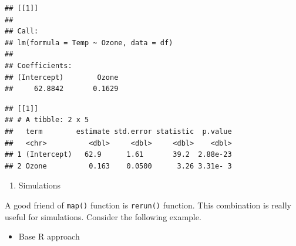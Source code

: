 \documentclass[
]{book}
\newenvironment{Shaded}{\begin{snugshade}}{\end{snugshade}}
\newcommand{\AttributeTok}[1]{\textcolor[rgb]{0.13,0.29,0.53}{#1}}
\newcommand{\CommentTok}[1]{\textcolor[rgb]{0.56,0.35,0.01}{\textit{#1}}}
\newcommand{\DecValTok}[1]{\textcolor[rgb]{0.00,0.00,0.81}{#1}}
\newcommand{\FunctionTok}[1]{\textcolor[rgb]{0.13,0.29,0.53}{\textbf{#1}}}
\newcommand{\NormalTok}[1]{#1}
\newcommand{\OtherTok}[1]{\textcolor[rgb]{0.56,0.35,0.01}{#1}}
\newcommand{\SpecialCharTok}[1]{\textcolor[rgb]{0.81,0.36,0.00}{\textbf{#1}}}
\providecommand{\tightlist}{%
  \setlength{\itemsep}{0pt}\setlength{\parskip}{0pt}}
\begin{document}
\begin{verbatim}
## [[1]]
## 
## Call:
## lm(formula = Temp ~ Ozone, data = df)
## 
## Coefficients:
## (Intercept)        Ozone  
##     62.8842       0.1629
\end{verbatim}

\begin{Shaded}
\end{Shaded}

\begin{verbatim}
## [[1]]
## # A tibble: 2 x 5
##   term        estimate std.error statistic  p.value
##   <chr>          <dbl>     <dbl>     <dbl>    <dbl>
## 1 (Intercept)   62.9      1.61       39.2  2.88e-23
## 2 Ozone          0.163    0.0500      3.26 3.31e- 3
\end{verbatim}

\begin{enumerate}
\def\labelenumi{\arabic{enumi}.}
\setcounter{enumi}{1}
\tightlist
\item
  Simulations
\end{enumerate}

A good friend of \texttt{map()} function is \texttt{rerun()} function. This combination is really useful for simulations. Consider the following example.

\begin{itemize}
\tightlist
\item
  Base R approach
\end{itemize}
\end{document}
